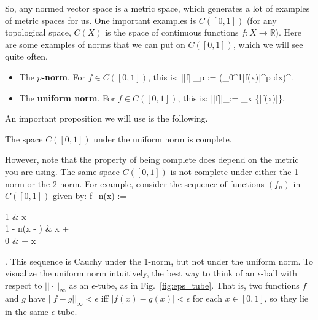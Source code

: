 	So, any normed vector space is a metric space, which generates a lot of examples of metric spaces for us. One important examples is $C([0, 1])$ (for 
	any topological space, $C(X)$ is the space of continuous functions $f : X\rightarrow\mathbb R$). Here are some examples of norms that we can put on 
	$C([0, 1])$, which we will see quite often. 
	\begin{itemize}
		\item The \textbf{$p$-norm}. For $f\in C([0, 1])$, this is:
		\eq
			||f||_p := \left(\int_0^1|f(x)|^p dx\right)^{}.
		\qe
		\item The \textbf{uniform norm}. For $f\in C([0, 1])$, this is:
		\eq
			||f||_\infty := \sup_{x\in [0, 1]} \{|f(x)|\}.
		\qe
	\end{itemize}
	An important proposition we will use is the following.
	\begin{prop}
		The space $C([0, 1])$ under the uniform norm is complete.
	\end{prop}
	However, note that the property of being complete does depend on the metric you are using. The same space $C([0, 1])$ is not complete under either the 
	1-norm or the 2-norm. For example, consider the sequence of functions $(f_n)$ in $C([0, 1])$ given by:
	\eq
		f_n(x) := \begin{cases}
			1 & x\leq{} \\
			1 - n(x - \frac{1}{2}) & \leq x \leq{} +  \\
			0 &  +  \leq x
		\end{cases}.
	\qe
	This sequence is Cauchy under the 1-norm, but not under the uniform norm. To visualize the uniform norm intuitively, the best way to think of an $\epsilon$-ball 
	with respect to $||\cdot||_\infty$ as an $\epsilon$-tube, as in Fig.~\eqref{fig:eps_tube}. That is, two functions $f$ and $g$ have $||f - g||_\infty < \epsilon$ iff $|f(x) - g(x)| < \epsilon$ for each $x\in [0, 1]$, so they lie in the same $\epsilon$-tube.
	
